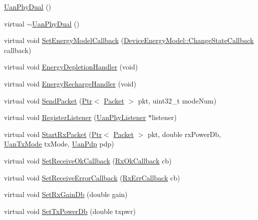 \begin{DoxyCompactItemize}
\item 
\hyperlink{classns3_1_1UanPhyDual_a98a7837a9c2c08c0851aafbca1d9179d}{Uan\+Phy\+Dual} ()
\item 
virtual \hyperlink{classns3_1_1UanPhyDual_a66ebdde402ef97523699cd5802eb995a}{$\sim$\+Uan\+Phy\+Dual} ()
\item 
virtual void \hyperlink{classns3_1_1UanPhyDual_a1abb018c4429781e9c27b30d03bc9d8f}{Set\+Energy\+Model\+Callback} (\hyperlink{classns3_1_1DeviceEnergyModel_a26632ed1b86ee8f6c7fc4c756f0027ad}{Device\+Energy\+Model\+::\+Change\+State\+Callback} callback)
\item 
virtual void \hyperlink{classns3_1_1UanPhyDual_a3fe7f32767eae67fe614058320130a8f}{Energy\+Depletion\+Handler} (void)
\item 
virtual void \hyperlink{classns3_1_1UanPhyDual_a67bfaca2f5276f10344c327a66f1cf4c}{Energy\+Recharge\+Handler} (void)
\item 
virtual void \hyperlink{classns3_1_1UanPhyDual_a2909357268086f3f2b847f322dbffcf5}{Send\+Packet} (\hyperlink{classns3_1_1Ptr}{Ptr}$<$ \hyperlink{classns3_1_1Packet}{Packet} $>$ pkt, uint32\+\_\+t mode\+Num)
\item 
virtual void \hyperlink{classns3_1_1UanPhyDual_ab1cc3c5129069ccaf68e65a72eaf563a}{Register\+Listener} (\hyperlink{classns3_1_1UanPhyListener}{Uan\+Phy\+Listener} $\ast$listener)
\item 
virtual void \hyperlink{classns3_1_1UanPhyDual_a8c6c7b5e11f415f8c31c355e95628408}{Start\+Rx\+Packet} (\hyperlink{classns3_1_1Ptr}{Ptr}$<$ \hyperlink{classns3_1_1Packet}{Packet} $>$ pkt, double rx\+Power\+Db, \hyperlink{classns3_1_1UanTxMode}{Uan\+Tx\+Mode} tx\+Mode, \hyperlink{classns3_1_1UanPdp}{Uan\+Pdp} pdp)
\item 
virtual void \hyperlink{classns3_1_1UanPhyDual_a3666cb446b9c6242940fe6d66e6b35c6}{Set\+Receive\+Ok\+Callback} (\hyperlink{classns3_1_1UanPhy_a0b4ce695657b1c0b7f52ae474f3d98f9}{Rx\+Ok\+Callback} cb)
\item 
virtual void \hyperlink{classns3_1_1UanPhyDual_a3131798528f80f16156e3a761b326aeb}{Set\+Receive\+Error\+Callback} (\hyperlink{classns3_1_1UanPhy_ae0da6892a65ba998fb1d649f31b118c4}{Rx\+Err\+Callback} cb)
\item 
virtual void \hyperlink{classns3_1_1UanPhyDual_a10b3e5437e322a3a2285e6520523c3bb}{Set\+Rx\+Gain\+Db} (double gain)
\item 
virtual void \hyperlink{classns3_1_1UanPhyDual_a043a4cae3dda3d47401a78298d1a72d1}{Set\+Tx\+Power\+Db} (double txpwr)

\end{DoxyCompactItemize}
